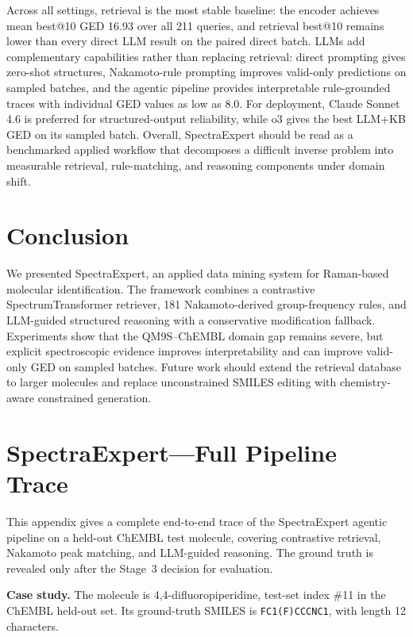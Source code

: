 \documentclass[conference]{IEEEtran}
\begin{document}
Across all settings, retrieval is the most stable baseline: the encoder achieves mean best@10 GED 16.93 over all 211 queries, and retrieval best@10 remains lower than every direct LLM result on the paired direct batch. LLMs add complementary capabilities rather than replacing retrieval: direct prompting gives zero-shot structures, Nakamoto-rule prompting improves valid-only predictions on sampled batches, and the agentic pipeline provides interpretable rule-grounded traces with individual GED values as low as 8.0. For deployment, Claude Sonnet 4.6 is preferred for structured-output reliability, while o3 gives the best LLM+KB GED on its sampled batch. Overall, SpectraExpert should be read as a benchmarked applied workflow that decomposes a difficult inverse problem into measurable retrieval, rule-matching, and reasoning components under domain shift.

\section{Conclusion}

We presented SpectraExpert, an applied data mining system for Raman-based molecular identification. The framework combines a contrastive SpectrumTransformer retriever, 181 Nakamoto-derived group-frequency rules, and LLM-guided structured reasoning with a conservative modification fallback. Experiments show that the QM9S--ChEMBL domain gap remains severe, but explicit spectroscopic evidence improves interpretability and can improve valid-only GED on sampled batches. Future work should extend the retrieval database to larger molecules and replace unconstrained SMILES editing with chemistry-aware constrained generation.




\appendices
\section{SpectraExpert---Full Pipeline Trace}

This appendix gives a complete end-to-end trace of the SpectraExpert agentic pipeline on a held-out ChEMBL test molecule, covering contrastive retrieval, Nakamoto peak matching, and LLM-guided reasoning. The ground truth is revealed only after the Stage~3 decision for evaluation.

\textbf{Case study.} The molecule is 4,4-difluoropiperidine, test-set index \#11 in the ChEMBL held-out set. Its ground-truth SMILES is \texttt{FC1(F)CCCNC1}, with length 12 characters.
\end{document}
